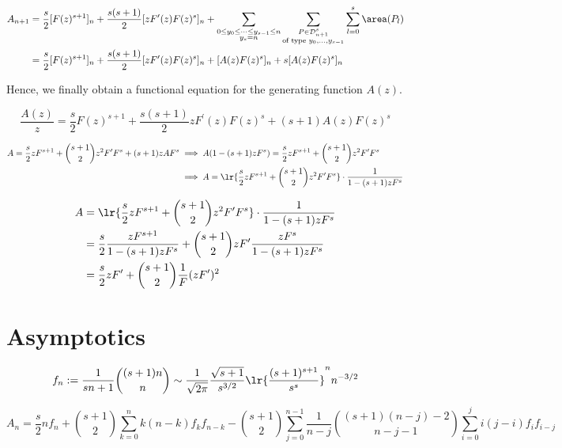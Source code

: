 \documentclass[12pt]{article}
\begin{document}
\begin{align*}
  A_{n+1} &= \frac{s}{2}[F(z)^{s+1}]_{n} + \frac{s(s+1)}{2}[zF^{\prime}(z)F(z)^{s}]_{n} + \sum_{\substack{0\leq y_{0}\leq \cdots\leq y_{s-1}\leq n\\y_{s}=n}} \sum_{\substack{P\in \mathcal{D}_{n+1}^{s}\\\text{of type }y_{0},\ldots, y_{s-1}}}  \sum_{l=0}^{s}\area(P_{l})  \\
    &=\frac{s}{2}[F(z)^{s+1}]_{n} + \frac{s(s+1)}{2}[zF^{\prime}(z)F(z)^{s}]_{n}+ [A(z)F(z)^{s}]_{n}+s[A(z)F(z)^{s}]_{n} 
\end{align*}

Hence, we finally obtain a functional equation for the generating function $ A(z) $.

\begin{equation}\label{eq:funceqn}
    \frac{A(z)}{z} =  \frac{s}{2}F(z)^{s+1} + \frac{s(s+1)}{2}zF^{\prime}(z)F(z)^{s} + (s+1)A(z)F(z)^{s}
\end{equation}

\begin{align*}
  A = \frac{s}{2}zF^{s+1} + \binom{s+1}{2}z^{2}F^{\prime}F^{s}+(s+1)zAF^{s} &\implies A(1-(s+1)zF^{s}) = \frac{s}{2}zF^{s+1} + \binom{s+1}{2}z^{2}F^{\prime}F^{s}\\
&\implies A =\lr{\frac{s}{2}zF^{s+1} + \binom{s+1}{2}z^{2}F^{\prime}F^{s}} \cdot \frac{1}{1-(s+1)zF^{s}}
\end{align*}


\begin{align*}
  A &= \lr{\frac{s}{2}zF^{s+1} + \binom{s+1}{2}z^{2}F^{\prime}F^{s}} \cdot \frac{1}{1-(s+1)zF^{s}} \\
  &= \frac{s}{2}\frac{zF^{s+1}}{1-(s+1)zF^{s}} + \binom{s+1}{2}zF^{\prime}\frac{zF^{s}}{1-(s+1)zF^{s}} \\
  &= \frac{s}{2} zF^{\prime} +\binom{s+1}{2} \frac{1}{F} (zF^{\prime})^{2}
\end{align*}

\section{Asymptotics}

\[
  f_{n}:= \frac{1}{sn+1}\binom{(s+1)n}{n} \sim \frac{1}{\sqrt{2\pi}} \frac{\sqrt{s+1}}{s^{3/2}} \lr{\frac{(s+1)^{s+1}}{s^{s}}}^{n} n^{-3/2}
\]

\[
  A_{n}= \frac{s}{2}n f_{n} + \binom{s+1}{2}\sum_{k=0}^{n} k(n-k)f_{k}f_{n-k} - \binom{s+1}{2}\sum_{j=0}^{n-1}\frac{1}{n-j}\binom{(s+1)(n-j)-2}{n-j-1}\sum_{i=0}^{j}i(j-i)f_{i}f_{i-j}
\]
\end{document}
